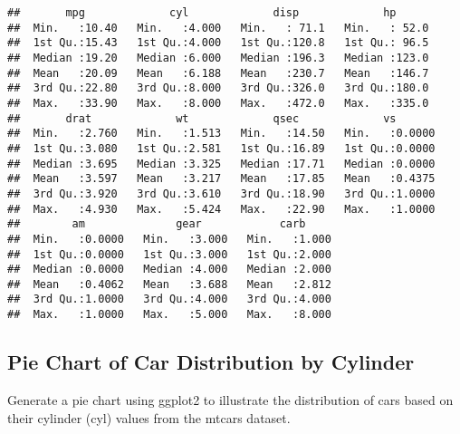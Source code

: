 \documentclass[
]{article}
\begin{document}
\begin{verbatim}
##       mpg             cyl             disp             hp       
##  Min.   :10.40   Min.   :4.000   Min.   : 71.1   Min.   : 52.0  
##  1st Qu.:15.43   1st Qu.:4.000   1st Qu.:120.8   1st Qu.: 96.5  
##  Median :19.20   Median :6.000   Median :196.3   Median :123.0  
##  Mean   :20.09   Mean   :6.188   Mean   :230.7   Mean   :146.7  
##  3rd Qu.:22.80   3rd Qu.:8.000   3rd Qu.:326.0   3rd Qu.:180.0  
##  Max.   :33.90   Max.   :8.000   Max.   :472.0   Max.   :335.0  
##       drat             wt             qsec             vs        
##  Min.   :2.760   Min.   :1.513   Min.   :14.50   Min.   :0.0000  
##  1st Qu.:3.080   1st Qu.:2.581   1st Qu.:16.89   1st Qu.:0.0000  
##  Median :3.695   Median :3.325   Median :17.71   Median :0.0000  
##  Mean   :3.597   Mean   :3.217   Mean   :17.85   Mean   :0.4375  
##  3rd Qu.:3.920   3rd Qu.:3.610   3rd Qu.:18.90   3rd Qu.:1.0000  
##  Max.   :4.930   Max.   :5.424   Max.   :22.90   Max.   :1.0000  
##        am              gear            carb      
##  Min.   :0.0000   Min.   :3.000   Min.   :1.000  
##  1st Qu.:0.0000   1st Qu.:3.000   1st Qu.:2.000  
##  Median :0.0000   Median :4.000   Median :2.000  
##  Mean   :0.4062   Mean   :3.688   Mean   :2.812  
##  3rd Qu.:1.0000   3rd Qu.:4.000   3rd Qu.:4.000  
##  Max.   :1.0000   Max.   :5.000   Max.   :8.000
\end{verbatim}

\hypertarget{pie-chart-of-car-distribution-by-cylinder}{%
\subsection{Pie Chart of Car Distribution by
Cylinder}\label{pie-chart-of-car-distribution-by-cylinder}}

Generate a pie chart using ggplot2 to illustrate the distribution of
cars based on their cylinder (cyl) values from the mtcars dataset.
\end{document}
